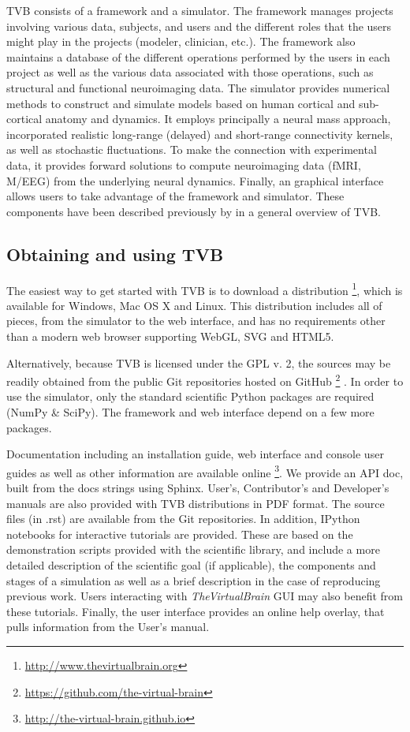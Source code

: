 \documentclass{bioinfo}
\newcommand{\TVB}{\textit{TheVirtualBrain }}
\begin{document}
TVB consists of a framework and a simulator. 
The framework manages projects involving various data, subjects, and users
and the different roles that the users might play in the projects (modeler, 
clinician, etc.). The framework also maintains a database of the different
operations performed by the users in each project as well as the various
data associated with those operations, such as structural and functional
neuroimaging data.
The simulator provides numerical methods to construct and simulate models
based on human cortical and sub-cortical anatomy and dynamics. It employs principally
a neural mass approach, incorporated realistic long-range (delayed) and
short-range connectivity kernels, as well as stochastic fluctuations. 
To make the connection with experimental data, it provides forward solutions to
compute neuroimaging data (fMRI, M/EEG) from the underlying neural dynamics. 
Finally, an graphical interface allows users to take advantage of the framework
and simulator. These components have been described previously by 
\citeauthor{Sanz-Leon_2013} \citeyear{Sanz-Leon_2013} in a general overview
of TVB.

\subsection{Obtaining and using TVB}

The easiest way to get started with TVB is to download a distribution
\footnote{\url{http://www.thevirtualbrain.org}}, which is available for Windows,
Mac OS X and Linux. This distribution includes
all of pieces, from the simulator to the web interface, and has no
requirements other than a modern web browser supporting WebGL, SVG and
HTML5.

Alternatively, because TVB is licensed under the GPL v. 2, the sources may be
readily obtained from the public Git repositories hosted on GitHub \footnote{\url{https://github.com/the-virtual-brain}} 
\citep{dabbish2012social}
. In order to use the simulator, 
only the standard scientific Python packages are required (NumPy \& SciPy).
The framework and web interface depend on a few more packages. 

Documentation including an installation guide, web interface and console 
user guides as well as other information are available online
\footnote{ \url{http://the-virtual-brain.github.io}}.
We provide an API doc, built from the docs strings using Sphinx.
User's, Contributor's and Developer's manuals are also provided with TVB
distributions in PDF format. The source files (in .rst) are available
from the Git repositories.
In addition, IPython notebooks \citep{PerezGranger_2007}
for interactive tutorials are provided. These are based on the
demonstration scripts provided with the scientific library, and
include a more detailed description of the scientific goal (if
applicable), the components and stages of a simulation as well as a
brief description in the case of reproducing previous work. Users
interacting with \TVB GUI may also benefit from these tutorials.
Finally, the user interface provides an online help overlay, that pulls
information from the User's manual.
\end{document}
